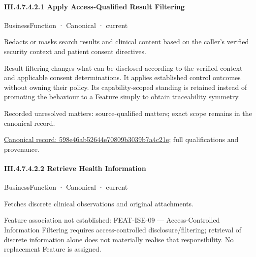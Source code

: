 \paragraph*{III.4.7.4.2.1 Apply Access-Qualified Result Filtering}
\label{navigation:III.4.7.4.2.1}

\label{element:598e46ab52644e70809b3039b7a4c21e}
{\small BusinessFunction · Canonical · current}\par

Redacts or masks search results and clinical content based on the caller's verified security context and patient consent directives.



Result filtering changes what can be disclosed according to the verified context and applicable consent determinations. It applies established control outcomes without owning their policy. Its capability-scoped standing is retained instead of promoting the behaviour to a Feature simply to obtain traceability symmetry.


{\small Recorded unresolved matters: source-qualified matters; exact scope remains in the canonical record.}\par
{\footnotesize \href{../../../../../../../../continuum/business/business-function/598e46ab52644e70809b3039b7a4c21e.md}{Canonical record: 598e46ab52644e70809b3039b7a4c21e}; full qualifications and provenance.}\par
\paragraph*{III.4.7.4.2.2 Retrieve Health Information}
\label{navigation:III.4.7.4.2.2}

\label{element:0afb265973744f6f9e95ee54e6ea5b77}
{\small BusinessFunction · Canonical · current}\par

Fetches discrete clinical observations and original attachments.



Feature association not established: FEAT-ISE-09 — Access-Controlled Information Filtering requires access-controlled disclosure/filtering; retrieval of discrete information alone does not materially realise that responsibility. No replacement Feature is assigned.



